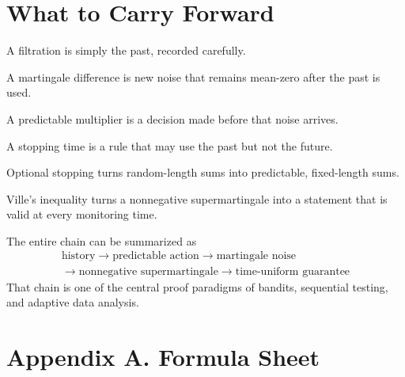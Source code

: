 \documentclass[en,nofont,11pt]{elegantbook}
\begin{document}
\chapter{What to Carry Forward}

A filtration is simply the past, recorded carefully.

A martingale difference is new noise that remains mean-zero after the past is used.

A predictable multiplier is a decision made before that noise arrives.

A stopping time is a rule that may use the past but not the future.

Optional stopping turns random-length sums into predictable, fixed-length sums.

Ville's inequality turns a nonnegative supermartingale into a statement that is valid at every monitoring time.

The entire chain can be summarized as
\[
\boxed{
\begin{gathered}
\text{history}
\to
\text{predictable action}
\to
\text{martingale noise}\\
\to
\text{nonnegative supermartingale}
\to
\text{time-uniform guarantee}
\end{gathered}
}
\]
That chain is one of the central proof paradigms of bandits, sequential testing, and adaptive data analysis.

\backmatter
\chapter*{Appendix A. Formula Sheet}
\end{document}
